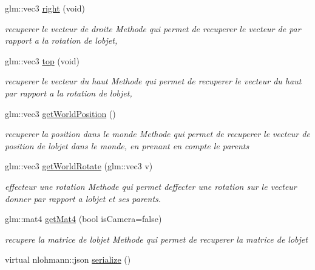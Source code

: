 \begin{DoxyCompactItemize}
glm\+::vec3 \mbox{\hyperlink{class_beer_engine_1_1_transform_afcd8cfe1fcd321abcb0950127ee4f76d}{right}} (void)
\begin{DoxyCompactList}\small\item\em recuperer le vecteur de droite Methode qui permet de recuperer le vecteur de par rapport a la rotation de l\textquotesingle{}objet, \end{DoxyCompactList}\item 
glm\+::vec3 \mbox{\hyperlink{class_beer_engine_1_1_transform_a5fbee07c1e2151d649d2eb82ec854ac0}{top}} (void)
\begin{DoxyCompactList}\small\item\em recuperer le vecteur du haut Methode qui permet de recuperer le vecteur du haut par rapport a la rotation de l\textquotesingle{}objet, \end{DoxyCompactList}\item 
glm\+::vec3 \mbox{\hyperlink{class_beer_engine_1_1_transform_a2699038279b5b41831ff706c5ccc9348}{get\+World\+Position}} ()
\begin{DoxyCompactList}\small\item\em recuperer la position dans le monde Methode qui permet de recuperer le vecteur de position de l\textquotesingle{}objet dans le monde, en prenant en compte le parents \end{DoxyCompactList}\item 
glm\+::vec3 \mbox{\hyperlink{class_beer_engine_1_1_transform_a7aaf81b4672307edc39e9b208430ec59}{get\+World\+Rotate}} (glm\+::vec3 v)
\begin{DoxyCompactList}\small\item\em effecteur une rotation Methode qui permet d\textquotesingle{}effecter une rotation sur le vecteur donner par rapport a l\textquotesingle{}objet et ses parents. \end{DoxyCompactList}\item 
glm\+::mat4 \mbox{\hyperlink{class_beer_engine_1_1_transform_a9b7d3168270eb800c3e40af55c55fdc5}{get\+Mat4}} (bool is\+Camera=false)
\begin{DoxyCompactList}\small\item\em recupere la matrice de l\textquotesingle{}objet Methode qui permet de recuperer la matrice de l\textquotesingle{}objet \end{DoxyCompactList}\item 
virtual nlohmann\+::json \mbox{\hyperlink{class_beer_engine_1_1_transform_aafa05f7ad8f420d5aa35671fd1f65d37}{serialize}} ()
\end{DoxyCompactItemize}
